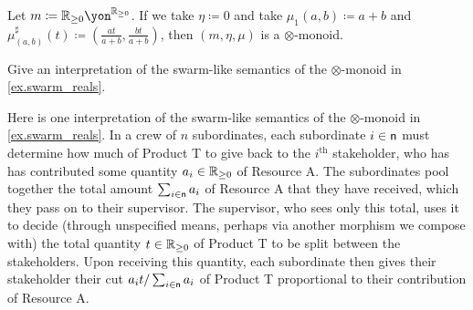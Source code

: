 \documentclass[Book-Poly]{subfiles}
\begin{document}
\begin{example}\label{ex.swarm_reals}
Let $m\coloneqq\rr_{\geq0}\yon^{\rr_{\geq0}}$. If we take $\eta\coloneqq0$ and take $\mu_1(a,b) \coloneqq a+b$ and $\mu^\sharp_{(a,b)}(t) \coloneqq \left(\frac{at}{a+b},\frac{bt}{a+b}\right)$, then $(m, \eta, \mu)$ is a $\otimes$-monoid.
\end{example}

\begin{exercise}
Give an interpretation of the swarm-like semantics of the $\otimes$-monoid in \cref{ex.swarm_reals}.
\begin{solution}
Here is one interpretation of the swarm-like semantics of the $\otimes$-monoid in \cref{ex.swarm_reals}.
In a crew of $n$ subordinates, each subordinate $i \in \mathsf{n}$ must determine how much of Product T to give back to the $i^\text{th}$ stakeholder, who has has contributed some quantity $a_i \in \mathbb{R}_{\geq0}$ of Resource A.
The subordinates pool together the total amount $\sum_{i \in \mathsf{n}} a_i$ of Resource A that they have received, which they pass on to their supervisor.
The supervisor, who sees only this total, uses it to decide (through unspecified means, perhaps via another morphism we compose with) the total quantity $t \in \mathbb{R}_{\geq0}$ of Product T to be split between the stakeholders.
Upon receiving this quantity, each subordinate then gives their stakeholder their cut $a_i t / \sum_{i \in \mathsf{n}} a_i$ of Product T proportional to their contribution of Resource A.


\end{solution}
\end{exercise}
\end{document}
